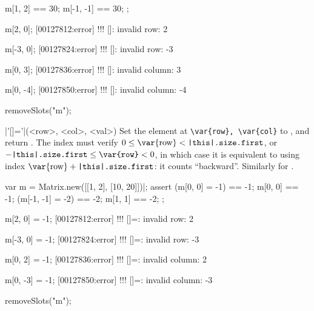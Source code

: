 \begin{urbiscriptapi}
\begin{urbiscript}
{  m[1, 2] == 30;  m[-1, -1] == 30;
};

m[2, 0];
[00127812:error] !!! []: invalid row: 2

m[-3, 0];
[00127824:error] !!! []: invalid row: -3

m[0, 3];
[00127836:error] !!! []: invalid column: 3

m[0, -4];
[00127850:error] !!! []: invalid column: -4
\end{urbiscript}
\begin{urbicomment}
  removeSlots("m");
\end{urbicomment}


\item|'[]='|(<row>, <col>, <val>)%
  Set the element at \lstinline|\var{row}, \var{col}| to , and
  return .  The index  must verify $0 \le
  \textrm{\var{row}} < \texttt{\this.size.first}$, or
  $-\texttt{\this.size.first} \le \texttt{\var{row}} < 0$, in which case it
  is equivalent to using index $\textrm{\var{row}} +
  \texttt{\this.size.first}$: it counts ``backward''.  Similarly for
  .
\begin{urbiscript}
var m = Matrix.new([[1, 2], [10, 20]])|;
assert
{
  (m[0, 0]  = -1) == -1;   m[0, 0] == -1;
  (m[-1, -1] = -2) == -2;  m[1, 1] == -2;
};

m[2, 0] = -1;
[00127812:error] !!! []=: invalid row: 2

m[-3, 0] = -1;
[00127824:error] !!! []=: invalid row: -3

m[0, 2] = -1;
[00127836:error] !!! []=: invalid column: 2

m[0, -3] = -1;
[00127850:error] !!! []=: invalid column: -3
\end{urbiscript}
\begin{urbicomment}
  removeSlots("m");
\end{urbicomment}

\end{urbiscriptapi}

